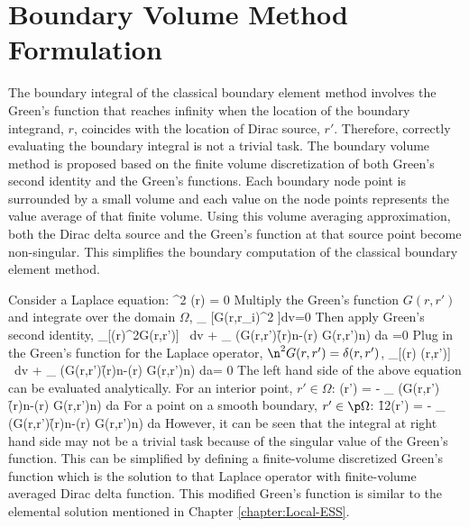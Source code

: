 \section{Boundary Volume Method Formulation}
The boundary integral of the classical boundary element method involves the Green's function that reaches infinity when the location of the boundary integrand, $r$, coincides with the location of Dirac source, $r'$. Therefore, correctly evaluating the boundary integral is not a trivial task. The boundary volume method is proposed based on the finite volume discretization of both Green's second identity and the Green's functions. Each boundary node point is surrounded by a small volume and each value on the node points represents the value average of that finite volume. Using this volume averaging approximation, both the Dirac delta source and the Green's function at that source point become non-singular. This simplifies the boundary computation of the classical boundary element method.

Consider a Laplace equation:
\be
\n^2 \Phi(r) = 0
\ee
Multiply the Green's function $G(r, r')$ and integrate over the domain $\Omega$,
\be
\int_{\Omega} [G(r,r_i)\n^2 \Phi]dv=0
\ee
Then apply Green's second identity,
\be
\int_{\Omega}[\Phi(r)\n^2G(r,r')] \ dv + \int_{\p \Omega} (G(r,r')\f{\p\Phi(r)}{\p n}-\Phi(r)\f{ \p G(r,r')}{\p n}) da =0 \ee
Plug in the Green's function for the Laplace operator, $\n^2 G(r,r') = \delta(r,r')$,
\be
\int_{\Omega}[\Phi(r) \delta(r,r')] \ dv + \int_{\p \Omega} (G(r,r')\f{\p\Phi(r)}{\p n}-\Phi(r)\f{ \p G(r,r')}{\p n}) da= 0
\ee
The left hand side of the above equation can be evaluated analytically. For an interior point, $r' \in \Omega$:
\be
\Phi(r') = - \int_{\p \Omega} (G(r,r')\f{\p\Phi(r)}{\p n}-\Phi(r)\f{ \p G(r,r')}{\p n}) da
\ee
For a point on a smooth boundary, $r' \in \p \Omega$:
\be
\f{1}{2}\Phi(r') = - \int_{\p \Omega} (G(r,r')\f{\p\Phi(r)}{\p n}-\Phi(r)\f{ \p G(r,r')}{\p n}) da
\ee
However, it can be seen that the integral at right hand side may not be a trivial task because of the singular value of the Green's function. This can be simplified by defining a finite-volume discretized Green's function which is the solution to that Laplace operator with finite-volume averaged Dirac delta function.
This modified Green's function is similar to the elemental solution mentioned in Chapter \ref{chapter:Local-ESS}.








